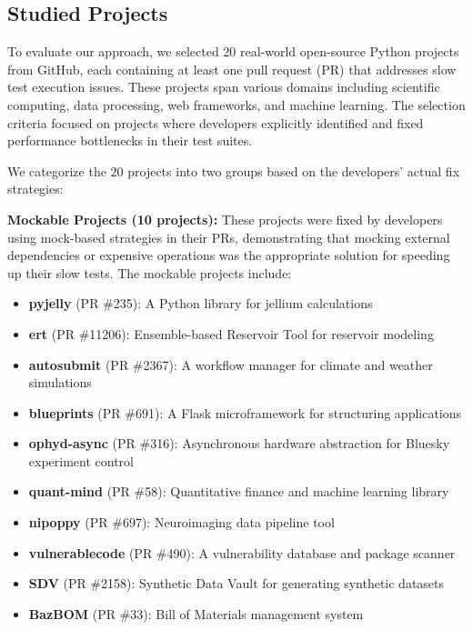 \subsection{Studied Projects}
\label{subsec:studied-projects}

To evaluate our approach, we selected 20 real-world open-source Python projects from GitHub, each containing at least one pull request (PR) that addresses slow test execution issues. These projects span various domains including scientific computing, data processing, web frameworks, and machine learning. The selection criteria focused on projects where developers explicitly identified and fixed performance bottlenecks in their test suites.

We categorize the 20 projects into two groups based on the developers' actual fix strategies:

\textbf{Mockable Projects (10 projects):} These projects were fixed by developers using mock-based strategies in their PRs, demonstrating that mocking external dependencies or expensive operations was the appropriate solution for speeding up their slow tests. The mockable projects include:

\begin{itemize}
    \item \textbf{pyjelly} (PR \#235): A Python library for jellium calculations
    \item \textbf{ert} (PR \#11206): Ensemble-based Reservoir Tool for reservoir modeling
    \item \textbf{autosubmit} (PR \#2367): A workflow manager for climate and weather simulations
    \item \textbf{blueprints} (PR \#691): A Flask microframework for structuring applications
    \item \textbf{ophyd-async} (PR \#316): Asynchronous hardware abstraction for Bluesky experiment control
    \item \textbf{quant-mind} (PR \#58): Quantitative finance and machine learning library
    \item \textbf{nipoppy} (PR \#697): Neuroimaging data pipeline tool
    \item \textbf{vulnerablecode} (PR \#490): A vulnerability database and package scanner
    \item \textbf{SDV} (PR \#2158): Synthetic Data Vault for generating synthetic datasets
    \item \textbf{BazBOM} (PR \#33): Bill of Materials management system
\end{itemize}

